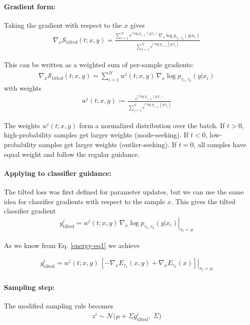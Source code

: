 \documentclass{article}
\begin{document}
\paragraph{Gradient form:}
Taking the gradient with respect to the  $x$ gives
\begin{align}
\nabla_{x} \mathcal{S}_{tilted}(t; x, y) 
= \frac{\sum_{i=1}^N e^{t  \log p_{\tau_1,\tau_2}(y|x_i)} \, \nabla_{x} \log p_{\tau_1,\tau_2}(y|x_i)}
        {\sum_{j=1}^N e^{t  \log p_{\tau_1,\tau_2}(y|x_j)}}
\end{align}

This can be written as a weighted sum of per-sample gradients:
\begin{align}
\nabla_{x} \mathcal{S}_{tilted}(t; x, y) 
= \sum_{i=1}^N w^i(t; x, y) \,\nabla_{x}  \log p_{\tau_1,\tau_2}(y|x_i)
\end{align}
with weights
\begin{align}
w^i(t; x, y) := \frac{e^{t  \log p_{\tau_1,\tau_2}(y|x_i)}}{\sum_{j=1}^N e^{t \log p_{\tau_1,\tau_2}(y|x_j)}}
\end{align}

The weights $w^i(t; x, y)$ form a normalized distribution over the batch. If $t>0$, high-probability samples get larger weights (mode-seeking). If $t<0$, low-probability samples get larger weights (outlier-seeking). If $t=0$, all samples have equal weight and follow the regular guidance.

\paragraph{Applying to classifier guidance:}
The tilted loss was first defined for parameter updates, but we can use the same idea for classifier gradients with respect to the sample $x$.  
This gives the tilted classifier gradient
\begin{align}
g^i_{\text{tilted}} 
= w^i(t; x, y)\,\left. \nabla_{x}  \log p_{\tau_1,\tau_2}(y|x_i)\right|_{x_t=\mu}
\end{align}

As we know from Eq. \ref{energy-eq1} we achieve 

\begin{align}
g^i_{\text{tilted}} 
= w^i(t; x, y)\,\left.[-\nabla_{x} E_{\tau_1}(x, y)+\nabla_{x} E_{\tau_2}(x) ] \right|_{x_t=\mu}
\end{align}
\paragraph{Sampling step:}
The modified sampling rule becomes
\begin{align}
z^i \sim \mathcal{N}\!\big(\mu + \Sigma g^i_{\text{tilted}}, \; \Sigma\big)
\end{align}
\end{document}
